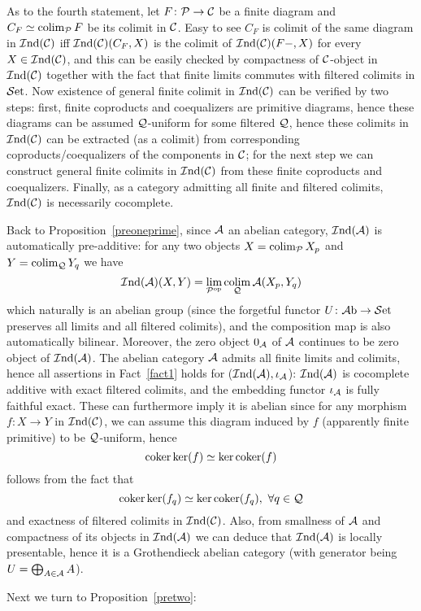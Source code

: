 \documentclass[twoside]{article}
\begin{document}
As to the fourth statement, let $F\colon {\mathcal{P}} \rightarrow {\mathcal{C}}$ be a finite diagram and $C_F \simeq \operatorname*{\mathrm{colim}}_{\mathcal{P}} F$ be its colimit in ${\mathcal{C}}$. Easy to see $C_F$ is colimit of the same diagram in $\mathcal{I}\mathrm{nd}({\mathcal{C}})$ iff $\mathcal{I}\mathrm{nd}({\mathcal{C}})(C_F, X)$ is the colimit of $\mathcal{I}\mathrm{nd}({\mathcal{C}})(F-,X)$ for every $X \in \mathcal{I}\mathrm{nd}({\mathcal{C}})$, and this can be easily checked by compactness of ${\mathcal{C}}$-object in $\mathcal{I}\mathrm{nd}({\mathcal{C}})$ together with the fact that finite limits commutes with filtered colimits in $\mathcal{S}\mathrm{et}$. Now existence of general finite colimit in $\mathcal{I}\mathrm{nd}({\mathcal{C}})$ can be verified by two steps: first, finite coproducts and coequalizers are primitive diagrams, hence these diagrams can be assumed ${\mathcal{Q}}$-uniform for some filtered ${\mathcal{Q}}$, hence these colimits in $\mathcal{I}\mathrm{nd}({\mathcal{C}})$ can be extracted (as a colimit) from corresponding coproducts/coequalizers of the components in ${\mathcal{C}}$; for the next step we can construct general finite colimits in $\mathcal{I}\mathrm{nd}({\mathcal{C}})$ from these finite coproducts and coequalizers. Finally, as a category admitting all finite and filtered colimits, $\mathcal{I}\mathrm{nd}({\mathcal{C}})$ is necessarily cocomplete.
\epf

Back to Proposition~\ref{preoneprime}, since ${\mathcal{A}}$ an abelian category, $\mathcal{I}\mathrm{nd}({\mathcal{A}})$ is automatically pre-additive: for any two objects $X = \operatorname*{\mathrm{colim}}_{\mathcal{P}} X_p$ and $Y = \operatorname*{\mathrm{colim}}_{\mathcal{Q}} Y_q$ we have
$$\mathcal{I}\mathrm{nd}({\mathcal{A}}) (X, Y) = \lim_{{\mathcal{P}}^{\mathrm{op}}} \operatorname*{\mathrm{colim}}_{\mathcal{Q}} {\mathcal{A}}(X_p, Y_q)$$
which naturally is an abelian group (since the forgetful functor $U\colon \mathcal{A}\mathrm{b} \rightarrow \mathcal{S}\mathrm{et}$ preserves all limits and all filtered colimits), and the composition map is also automatically bilinear. Moreover, the zero object $0_{\mathcal{A}}$ of ${\mathcal{A}}$ continues to be zero object of $\mathcal{I}\mathrm{nd}({\mathcal{A}})$. The abelian category ${\mathcal{A}}$ admits all finite limits and colimits, hence all assertions in Fact~\ref{fact1} holds for ($\mathcal{I}\mathrm{nd}({\mathcal{A}}), \iota_{\mathcal{A}}$): $\mathcal{I}\mathrm{nd}({\mathcal{A}})$ is cocomplete additive with exact filtered colimits, and the embedding functor $\iota_{\mathcal{A}}$ is fully faithful exact. These can  furthermore imply it is abelian since for any morphism $f\colon X \rightarrow Y$ in $\mathcal{I}\mathrm{nd}({\mathcal{C}})$, we can assume this diagram induced by $f$ (apparently finite primitive) to be ${\mathcal{Q}}$-uniform, hence 
$$\operatorname*{\mathrm{coker}} \ker (f) \simeq \ker \operatorname*{\mathrm{coker}} (f)$$ 
follows from the fact that 
$$\operatorname*{\mathrm{coker}} \ker (f_q) \simeq \ker \operatorname*{\mathrm{coker}} (f_q), \ \forall q \in {\mathcal{Q}}$$
and exactness of filtered colimits in $\mathcal{I}\mathrm{nd}({\mathcal{C}})$. Also, from smallness of ${\mathcal{A}}$ and compactness of its objects in $\mathcal{I}\mathrm{nd}({\mathcal{A}})$ we can deduce that $\mathcal{I}\mathrm{nd}({\mathcal{A}})$ is locally presentable, hence it is a Grothendieck abelian category (with generator being $U = \bigoplus_{A \in {\mathcal{A}}} A$).
\epf

Next we turn to Proposition~\ref{pretwo}: 
\end{document}
